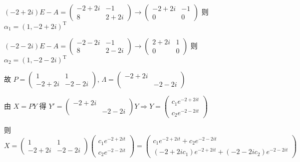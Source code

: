 \begin{enumerate}
                   \( (-2+2i)E - A = \begin{pmatrix}
                       -2+2i & -1   \\
                       8     & 2+2i
                   \end{pmatrix} \rightarrow \begin{pmatrix}
                       -2+2i & -1 \\
                       0     & 0
                   \end{pmatrix} \) 则 \( \alpha_{1} = (1, -2+2i)^{\mathrm{T}} \)

                   \( (-2-2i)E - A = \begin{pmatrix}
                       -2-2i & -1   \\
                       8     & 2-2i
                   \end{pmatrix} \rightarrow \begin{pmatrix}
                       2+2i & 1 \\
                       0    & 0
                   \end{pmatrix} \) 则 \( \alpha_{2} = (1, -2-2i)^{\mathrm{T}} \)

                   故 \( P = \begin{pmatrix}
                       1     & 1     \\
                       -2+2i & -2-2i
                   \end{pmatrix} \), \( \Lambda = \begin{pmatrix}
                       -2+2i &       \\
                             & -2-2i
                   \end{pmatrix} \)

                   由 \( X = P Y \) 得 \( Y' = \begin{pmatrix}
                       -2+2i &       \\
                             & -2-2i
                   \end{pmatrix} Y \Rightarrow Y = \begin{pmatrix}
                       c_{1}e^{-2+2it} \\
                       c_{2}e^{-2-2it}
                   \end{pmatrix} \)

                   则 \( X = \begin{pmatrix}
                       1     & 1     \\
                       -2+2i & -2-2i
                   \end{pmatrix}\begin{pmatrix}
                       c_{1}e^{-2+2it} \\
                       c_{2}e^{-2-2it}
                   \end{pmatrix} = \begin{pmatrix}
                       c_{1}e^{-2+2it} + c_{2}e^{-2-2it} \\
                       (-2+2ic_{1})e^{-2+2it} + (-2-2ic_{2})e^{-2-2it}
                   \end{pmatrix} \)


\end{enumerate}
